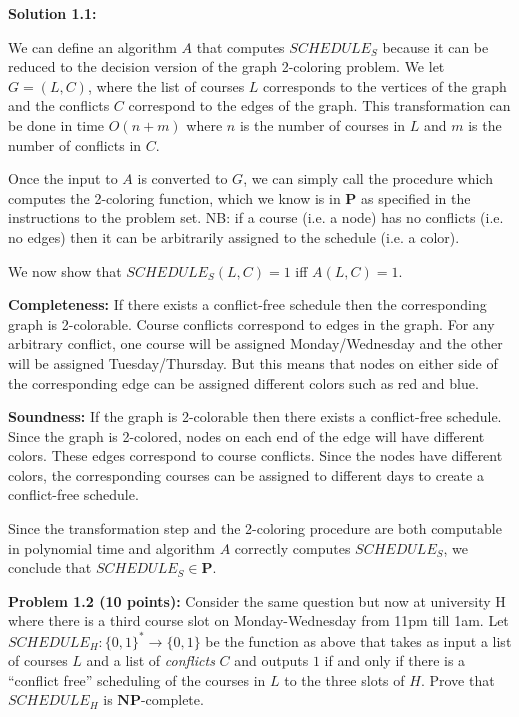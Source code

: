 \documentclass[11pt]{article}
\begin{document}
\textbf{Solution 1.1:}

We can define an algorithm $A$ that computes $SCHEDULE_S$ because it can be reduced to the decision version of the graph 2-coloring problem. We let $G = (L, C)$, where the list of courses $L$ corresponds to the vertices of the graph and the conflicts $C$ correspond to the edges of the graph. This transformation can be done in time $O(n + m)$ where $n$ is the number of courses in $L$ and $m$ is the number of conflicts in $C$. 

Once the input to $A$ is converted to $G$, we can simply call the procedure which computes the 2-coloring function, which we know is in $\mathbf{P}$ as specified in the instructions to the problem set. NB: if a course (i.e. a node) has no conflicts (i.e. no edges) then it can be arbitrarily assigned to the schedule (i.e. a color).

We now show that $SCHEDULE_S(L, C) = 1$ iff $A(L, C) = 1$.

\textbf{Completeness:} If there exists a conflict-free schedule then the corresponding graph is 2-colorable. Course conflicts correspond to edges in the graph. For any arbitrary conflict, one course will be assigned Monday/Wednesday and the other will be assigned Tuesday/Thursday. But this means that nodes on either side of the corresponding edge can be assigned different colors such as red and blue.

\textbf{Soundness:} If the graph is 2-colorable then there exists a conflict-free schedule. Since the graph is 2-colored, nodes on each end of the edge will have different colors. These edges correspond to course conflicts. Since the nodes have different colors, the corresponding courses can be assigned to different days to create a conflict-free schedule.

Since the transformation step and the 2-coloring procedure are both computable in polynomial time and algorithm $A$ correctly computes $SCHEDULE_S$, we conclude that $SCHEDULE_S \in \mathbf{P}$.

\newpage

\textbf{Problem 1.2 (10 points):} Consider the same question but now at
university H where there is a third course slot on Monday-Wednesday from
11pm till 1am. Let \(SCHEDULE_H:\{0,1\}^* \rightarrow \{0,1\}\) be the
function as above that takes as input a list of courses \(L\) and a list
of \emph{conflicts} \(C\) and outputs \(1\) if and only if there is a
``conflict free'' scheduling of the courses in \(L\) to the three slots
of \(H\). Prove that \(SCHEDULE_H\) is \(\mathbf{NP}\)-complete.
\end{document}
